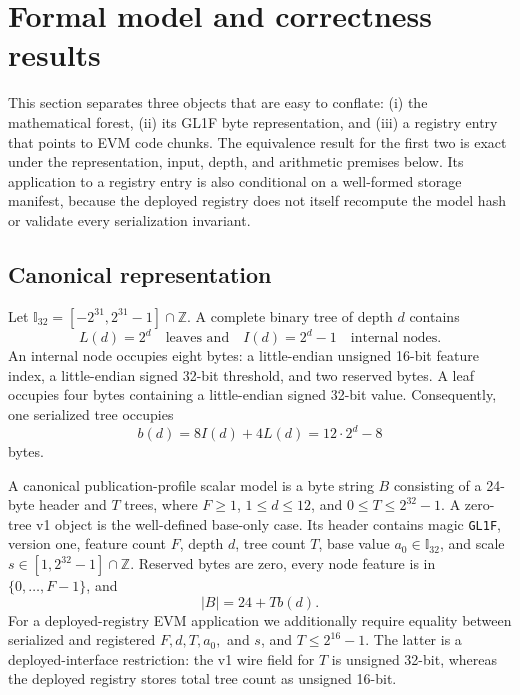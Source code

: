 
\section{Formal model and correctness results}
\label{sec:formal-results}

This section separates three objects that are easy to conflate:
(i) the mathematical forest, (ii) its GL1F byte representation, and
(iii) a registry entry that points to EVM code chunks.  The equivalence result
for the first two is exact under the representation, input, depth, and
arithmetic premises below.  Its application to a registry entry is also
conditional on a well-formed storage manifest, because the deployed registry
does not itself recompute the model hash or validate every serialization
invariant.

\subsection{Canonical representation}

Let $\mathbb{I}_{32}=[-2^{31},2^{31}-1]\cap\mathbb{Z}$.  A complete binary
tree of depth $d$ contains
\begin{equation}
  L(d)=2^d
  \quad\text{leaves and}\quad
  I(d)=2^d-1
  \quad\text{internal nodes}.
\end{equation}
An internal node occupies eight bytes: a little-endian unsigned 16-bit feature
index, a little-endian signed 32-bit threshold, and two reserved bytes.
A leaf occupies four bytes containing a little-endian signed 32-bit value.
Consequently, one serialized tree occupies
\begin{equation}
  b(d)=8I(d)+4L(d)=12\cdot 2^d-8
  \label{eq:tree-bytes}
\end{equation}
bytes.

\begin{definition}
\label{def:gl1f-v1}
A canonical publication-profile scalar model is a byte string $B$ consisting
of a 24-byte header and $T$ trees, where $F\ge1$, $1\le d\le12$, and
$0\le T\le2^{32}-1$.  A zero-tree v1 object is the well-defined base-only
case.  Its header contains magic \texttt{GL1F}, version one, feature count
$F$, depth $d$, tree count $T$, base value
$a_0\in\mathbb{I}_{32}$, and scale
$s\in[1,2^{32}-1]\cap\mathbb{Z}$.  Reserved bytes are zero, every node feature
is in $\{0,\ldots,F-1\}$, and
\begin{equation}
  |B|=24+T b(d).
  \label{eq:v1-length}
\end{equation}
For a deployed-registry EVM application we additionally require equality
between serialized and registered $F,d,T,a_0,$ and $s$, and
$T\le2^{16}-1$.  The latter is a deployed-interface restriction: the v1 wire
field for $T$ is unsigned 32-bit, whereas the deployed registry stores total
tree count as unsigned 16-bit.
\end{definition}

